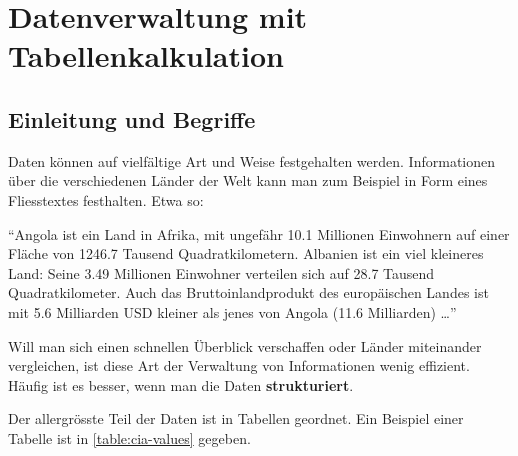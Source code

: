 \section{Datenverwaltung mit Tabellenkalkulation}
\label{subsec:tables}
\subsection{Einleitung und Begriffe}
\label{subsec:EinleitungTabellen}
Daten können auf vielfältige Art und Weise festgehalten werden. Informationen über die verschiedenen Länder der Welt kann man zum Beispiel in Form eines Fliesstextes festhalten. Etwa so:

\begin{center}
    \enquote{Angola ist ein Land in Afrika, mit ungefähr 10.1 Millionen Einwohnern auf einer Fläche von 1246.7 Tausend Quadratkilometern. Albanien ist ein viel kleineres Land: Seine 3.49 Millionen Einwohner verteilen sich auf 28.7 Tausend Quadratkilometer. Auch das Bruttoinlandprodukt des europäischen Landes ist mit 5.6 Milliarden USD kleiner als jenes von Angola (11.6 Milliarden) \dots }
\end{center}

Will man sich einen schnellen Überblick verschaffen oder Länder miteinander vergleichen, ist diese Art der Verwaltung von Informationen wenig effizient. Häufig ist es besser, wenn man die Daten \textbf{strukturiert}.

Der allergrösste Teil der Daten ist in Tabellen geordnet. Ein Beispiel einer Tabelle ist in \cref{table:cia-values} gegeben.

